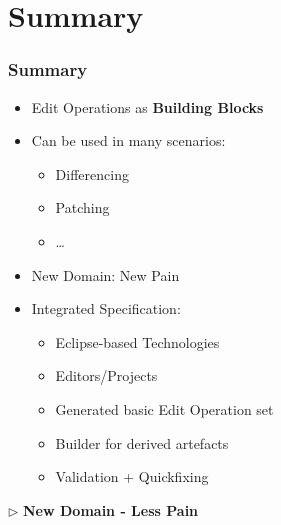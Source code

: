 \section{Summary}
\begin{frame}
  \frametitle{Summary}  
  \begin{itemize}
    \item Edit Operations as \textbf{Building Blocks}
    \item Can be used in many scenarios:
    \begin{itemize}
      \item Differencing
      \item Patching
      \item \ldots
      \end{itemize}
      \item New Domain: New Pain
    \item Integrated Specification:
    \begin{itemize}
      \item Eclipse-based Technologies
      \item Editors/Projects
      \item Generated basic Edit Operation set
      \item Builder for derived artefacts
      \item Validation + Quickfixing
      \end{itemize}
  \end{itemize}
  \medskip
  \centering
 $\triangleright$ \textbf{New Domain - Less Pain}
  \end{frame}
